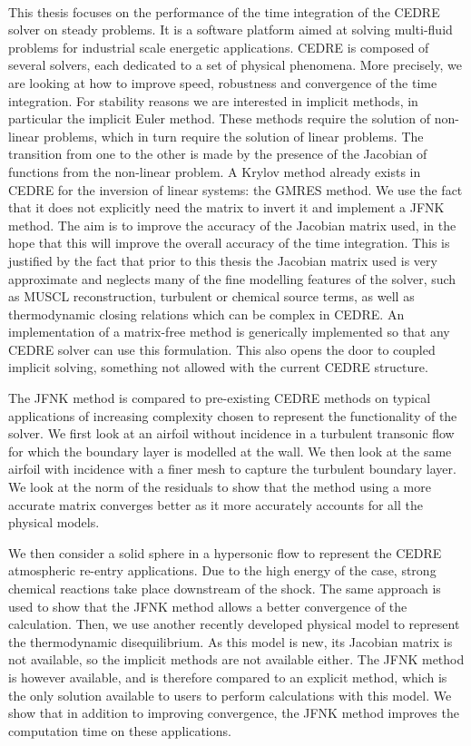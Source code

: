     \paragraph{}
This thesis focuses on the performance of the time integration of the CEDRE solver on steady problems.
It is a software platform aimed at solving multi-fluid problems for industrial scale energetic applications.
CEDRE is composed of several solvers, each dedicated to a set of physical phenomena.
More precisely, we are looking at how to improve speed, robustness and convergence of the time integration.
For stability reasons we are interested in implicit methods, in particular the implicit Euler method.
These methods require the solution of non-linear problems, which in turn require the solution of linear problems.
The transition from one to the other is made by the presence of the Jacobian of functions from the non-linear problem.
A Krylov method already exists in CEDRE for the inversion of linear systems: the GMRES method.
We use the fact that it does not explicitly need the matrix to invert it and implement a JFNK method.
The aim is to improve the accuracy of the Jacobian matrix used, in the hope that this will improve the overall accuracy of the time integration.
This is justified by the fact that prior to this thesis the Jacobian matrix used is very approximate and neglects many of the fine modelling features of the solver, such as MUSCL reconstruction, turbulent or chemical source terms, as well as thermodynamic closing relations which can be complex in CEDRE.
An implementation of a matrix-free method is generically implemented so that any CEDRE solver can use this formulation.
This also opens the door to coupled implicit solving, something not allowed with the current CEDRE structure.

The JFNK method is compared to pre-existing CEDRE methods on typical applications of increasing complexity chosen to represent the functionality of the solver.
We first look at an airfoil without incidence in a turbulent transonic flow for which the boundary layer is modelled at the wall.
We then look at the same airfoil with incidence with a finer mesh to capture the turbulent boundary layer.
We look at the norm of the residuals to show that the method using a more accurate matrix converges better as it more accurately accounts for all the physical models.

We then consider a solid sphere in a hypersonic flow to represent the CEDRE atmospheric re-entry applications.
Due to the high energy of the case, strong chemical reactions take place downstream of the shock.
The same approach is used to show that the JFNK method allows a better convergence of the calculation.
Then, we use another recently developed physical model to represent the thermodynamic disequilibrium.
As this model is new, its Jacobian matrix is not available, so the implicit methods are not available either.
The JFNK method is however available, and is therefore compared to an explicit method, which is the only solution available to users to perform calculations with this model.
We show that in addition to improving convergence, the JFNK method improves the computation time on these applications.

